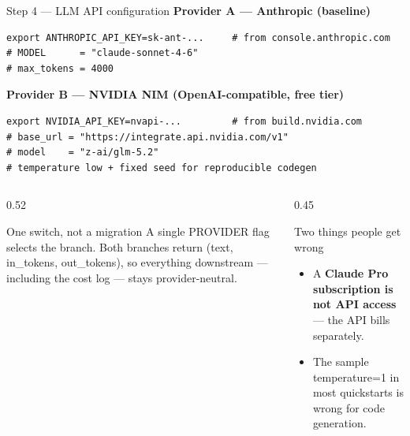 \documentclass[aspectratio=169,10pt]{beamer}
\newcommand{\code}[1]{{\ttfamily\small #1}}
\begin{document}
\begin{frame}[fragile]{Step 4 --- LLM API configuration}
\vspace{1mm}
\textbf{Provider A --- Anthropic (baseline)}
\begin{lstlisting}
export ANTHROPIC_API_KEY=sk-ant-...     # from console.anthropic.com
# MODEL      = "claude-sonnet-4-6"
# max_tokens = 4000
\end{lstlisting}
\textbf{Provider B --- NVIDIA NIM (OpenAI-compatible, free tier)}
\begin{lstlisting}
export NVIDIA_API_KEY=nvapi-...         # from build.nvidia.com
# base_url = "https://integrate.api.nvidia.com/v1"
# model    = "z-ai/glm-5.2"
# temperature low + fixed seed for reproducible codegen
\end{lstlisting}
\vspace{1mm}
\begin{columns}[T]
\begin{column}{0.52\textwidth}
\begin{block}{One switch, not a migration}
\small
A single \code{PROVIDER} flag selects the branch. Both branches return \code{(text, in\_tokens, out\_tokens)}, so everything downstream --- including the cost log --- stays provider-neutral.
\end{block}
\end{column}
\begin{column}{0.45\textwidth}
\begin{block}{Two things people get wrong}
\small
\begin{itemize}\footnotesize
  \item A \textbf{Claude Pro subscription is not API access} --- the API bills separately.
  \item The sample \code{temperature=1} in most quickstarts is wrong for code generation.
\end{itemize}
\end{block}
\end{column}
\end{columns}
\end{frame}
\end{document}
